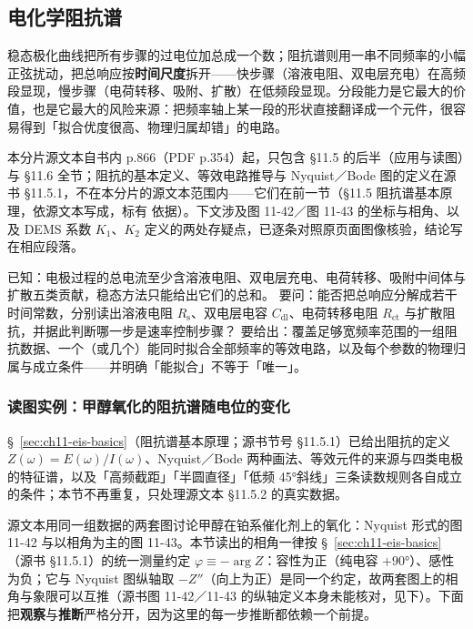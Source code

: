 \subsection{电化学阻抗谱}

稳态极化曲线把所有步骤的过电位加总成一个数；阻抗谱则用一串不同频率的小幅正弦扰动，把总响应按\textbf{时间尺度}拆开——快步骤（溶液电阻、双电层充电）在高频段显现，慢步骤（电荷转移、吸附、扩散）在低频段显现。分段能力是它最大的价值，也是它最大的风险来源：把频率轴上某一段的形状直接翻译成一个元件，很容易得到「拟合优度很高、物理归属却错」的电路。

本分片源文本自书内 p.866（PDF p.354）起，只包含 §11.5 的后半（应用与读图）与 §11.6 全节；阻抗的基本定义、等效电路推导与 Nyquist／Bode 图的定义在源书 §11.5.1，不在本分片的源文本范围内——它们在前一节（§11.5 阻抗谱基本原理，依源文本写成，标有 \src{} 依据）。下文涉及图 11-42／图 11-43 的坐标与相角、以及 DEMS 系数 $K_{1}$、$K_{2}$ 定义的两处存疑点，已逐条对照原页面图像核验，结论写在相应段落。

\begin{probout}
 已知：电极过程的总电流至少含溶液电阻、双电层充电、电荷转移、吸附中间体与扩散五类贡献，稳态方法只能给出它们的总和。
 要问：能否把总响应分解成若干时间常数，分别读出溶液电阻 $R_{\mathrm{s}}$、双电层电容 $C_{\mathrm{dl}}$、电荷转移电阻 $R_{\mathrm{ct}}$ 与扩散阻抗，并据此判断哪一步是速率控制步骤？
 要给出：覆盖足够宽频率范围的一组阻抗数据、一个（或几个）能同时拟合全部频率的等效电路，以及每个参数的物理归属与成立条件——并明确「能拟合」不等于「唯一」。
\end{probout}

\subsubsection{读图实例：甲醇氧化的阻抗谱随电位的变化}

§~\ref{sec:ch11-eis-basics}（阻抗谱基本原理；源书节号 §11.5.1）已给出阻抗的定义 $Z(\omega)=E(\omega)/I(\omega)$、Nyquist／Bode 两种画法、等效元件的来源与四类电极的特征谱，以及「高频截距」「半圆直径」「低频 45°斜线」三条读数规则各自成立的条件；本节不再重复，只处理源文本 §11.5.2 的真实数据。

源文本用同一组数据的两套图讨论甲醇在铂系催化剂上的氧化：Nyquist 形式的图 11-42 与以相角为主的图 11-43。本节读出的相角一律按 §~\ref{sec:ch11-eis-basics}（源书 §11.5.1）的统一测量约定 $\varphi\equiv-\arg Z$：容性为正（纯电容 $+90$°）、感性为负；它与 Nyquist 图纵轴取 $-Z''$（向上为正）是同一个约定，故两套图上的相角与象限可以互推（源书图 11-42／11-43 的纵轴定义本身未能核对，见下）。下面把\textbf{观察}与\textbf{推断}严格分开，因为这里的每一步推断都依赖一个前提。


